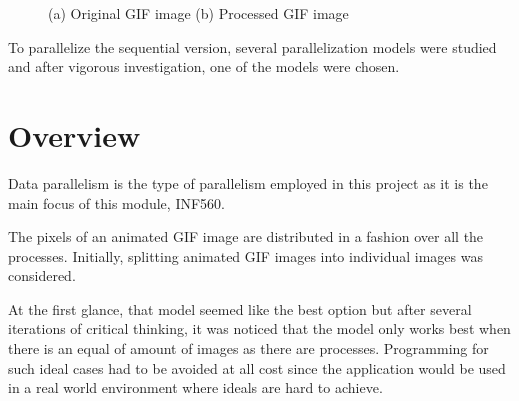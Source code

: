 \documentclass[11pt]{article}
\begin{document}
\begin{figure}[h]
	\caption{(a) Original GIF image (b) Processed GIF image}
	\label{fig:introduction}
\end{figure}

To parallelize the sequential version, several parallelization models were studied and after vigorous investigation, one of the models were chosen.
\section{Overview}
Data parallelism is the type of parallelism employed in this project as it is the main focus of this module, INF560. 

The pixels of an animated GIF image are distributed in a fashion over all the processes. Initially, splitting animated GIF images into individual images was considered. 

At the first glance, that model seemed like the best option but after several iterations of critical thinking, it was noticed that the model only works best when there is an equal of amount of images as there are processes. Programming for such ideal cases had to be avoided at all cost since the application would be used in a real world environment where ideals are hard to achieve.
\end{document}
